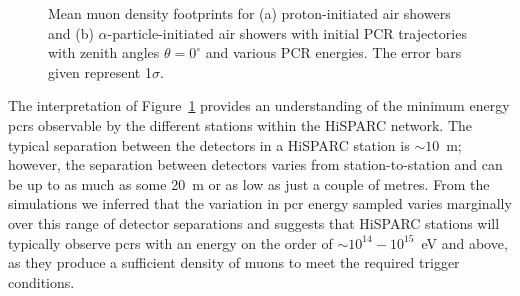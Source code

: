 \begin{figure}[ht!]
	\centering
	\qquad
	\caption{Mean muon density footprints for (a) proton-initiated air showers and (b) $\alpha$-particle-initiated air showers with initial PCR trajectories with zenith angles $\theta=0^{\circ}$ and various PCR energies. The error bars given represent 1$\sigma$.} \label{fig:shower_footprints}
\end{figure}

The interpretation of Figure~\ref{fig:shower_footprints} provides an understanding of the minimum energy \glspl{pcr} observable by the different stations within the HiSPARC network. The typical separation between the detectors in a HiSPARC station is $\sim 10$~m; however, the separation between detectors varies from station-to-station and can be up to as much as some 20~m or as low as just a couple of metres. From the simulations we inferred that the variation in \gls{pcr} energy sampled varies marginally over this range of detector separations and suggests that HiSPARC stations will typically observe \glspl{pcr} with an energy on the order of $\sim 10^{14}-10^{15}$~eV and above, as they produce a sufficient density of muons to meet the required trigger conditions. 

